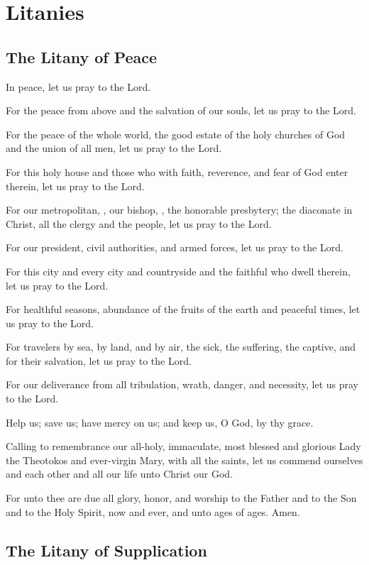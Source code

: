 \section{Litanies}

\subsection{The Litany of Peace}

In peace, let us pray to the Lord.

For the peace from above and the salvation of our souls, let us pray to the Lord.

For the peace of the whole world, the good estate of the holy churches of God and the union of all men, let us pray to the Lord.

For this holy house and those who with faith, reverence, and fear of God enter therein, let us pray to the Lord.

For our metropolitan, , our bishop, , the honorable presbytery; the diaconate in Christ, all the clergy and the people, let us pray to the Lord.

For our president, civil authorities, and armed forces, let us pray to the Lord.

For this city  and every city and countryside and the faithful who dwell therein, let us pray to the Lord.

For healthful seasons, abundance of the fruits of the earth and peaceful times, let us pray to the Lord.

For travelers by sea, by land, and by air, the sick, the suffering, the captive, and for their salvation, let us pray to the Lord.

For our deliverance from all tribulation, wrath, danger, and necessity, let us pray to the Lord.

Help us; save us; have mercy on us; and keep us, O God, by thy grace.

Calling to remembrance our all-holy, immaculate, most blessed and glorious Lady the Theotokos and ever-virgin Mary, with all the saints, let us commend ourselves and each other and all our life unto Christ our God.

For unto thee are due all glory, honor, and worship to the Father and to the Son and to the Holy Spirit, now and ever, and unto ages of ages. Amen.

\subsection{The Litany of Supplication}

